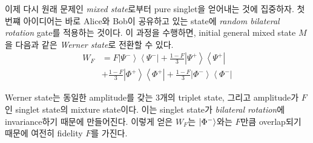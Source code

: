 \documentclass[
]{kaohandt}
\begin{document}
이제 다시 원래 문제인 \textit{mixed state}로부터 pure singlet을 얻어내는 것에 집중하자. 첫 번쨰 아이디어는 바로 Alice와 Bob이 공유하고 있는 state에 \textit{random bilateral rotation} gate를 적용하는 것이다.
이 과정을 수행하면, initial general mixed state $M$을 다음과 같은 \textit{Werner state}로 전환할 수 있다.
\begin{equation}
    \begin{aligned}
        W_F & =F \left|\Psi^{-}\right\rangle\left\langle\Psi^{-}\right|+\frac{1-F}{3}\left|\Psi^{+}\right\rangle\left\langle\Psi^{+}\right| \\
        & +\frac{1-F}{3}\left|\Phi^{+}\right\rangle\left\langle\Phi^{+}\right|+\frac{1-F}{3}\left|\Phi^{-}\right\rangle\left\langle\Phi^{-}\right|
    \end{aligned}
    \label{eq:WF}
\end{equation}

Werner state는 동일한 amplitude를 갖는 3개의 triplet state, 그리고 amplitude가 $F$인 singlet state의 mixture state이다. 이는 singlet state가 \textit{bilateral rotation}에 invariance하기 때문에 만들어진다.
이렇게 얻은 $W_F$는 $\ket{\Phi^-}$와는 $F$만큼 overlap되기 때문에 여전히 fidelity $F$를 가진다. 
\end{document}

